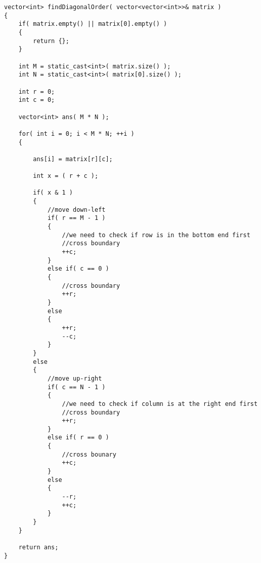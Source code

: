 \setcounter{lstlisting}{0}
\begin{lstlisting}[style=customc, caption={Without Extra Memory}]
vector<int> findDiagonalOrder( vector<vector<int>>& matrix )
{
    if( matrix.empty() || matrix[0].empty() )
    {
        return {};
    }

    int M = static_cast<int>( matrix.size() );
    int N = static_cast<int>( matrix[0].size() );

    int r = 0;
    int c = 0;

    vector<int> ans( M * N );

    for( int i = 0; i < M * N; ++i )
    {

        ans[i] = matrix[r][c];

        int x = ( r + c );

        if( x & 1 )
        {
            //move down-left
            if( r == M - 1 )
            {
                //we need to check if row is in the bottom end first
                //cross boundary
                ++c;
            }
            else if( c == 0 )
            {
                //cross boundary
                ++r;
            }
            else
            {
                ++r;
                --c;
            }
        }
        else
        {
            //move up-right
            if( c == N - 1 )
            {
                //we need to check if column is at the right end first
                //cross boundary
                ++r;
            }
            else if( r == 0 )
            {
                //cross bounary
                ++c;
            }
            else
            {
                --r;
                ++c;
            }
        }
    }

    return ans;
}
\end{lstlisting}